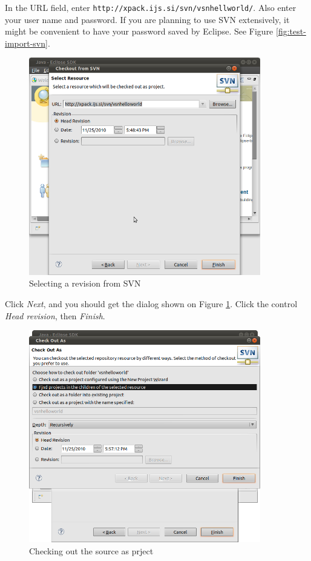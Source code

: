 \documentclass[a4paper, 10pt]{article}
\begin{document}
In the URL field, enter
\verb+http://xpack.ijs.si/svn/vsnhellworld/+.
Also enter your user name and password.
If you are planning to use SVN extensively, it might be convenient to have your
password saved by Eclipse.
See Figure \ref{fig:test-import-svn}.

    \begin{figure}[H]
    \centering
        \includegraphics[width=0.9\textwidth]{./png-install-guide/test-prj-head.png}
        \caption{Selecting a revision from SVN}
        \label{fig:test-prj-head}
    \end{figure}

Click \emph{Next}, and you should get the dialog shown on 
Figure \ref{fig:test-prj-head}.
Click the control \emph{Head revision}, then \emph{Finish}.

    \begin{figure}[H]
    \centering
        \includegraphics[width=0.9\textwidth]{./png-install-guide/test-checkout-as.png}
        \caption{Checking out the source as prject}
        \label{fig:test-checkout-as}
    \end{figure}
\end{document}
